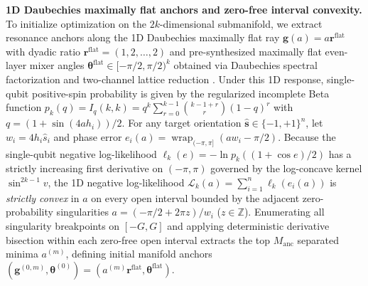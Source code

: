 \documentclass[10pt,a4paper]{article}
\begin{document}
\textbf{1D Daubechies maximally flat anchors and zero-free interval convexity.} To initialize optimization on the $2k$-dimensional submanifold, we extract resonance anchors along the 1D Daubechies maximally flat ray $\boldsymbol{g}(a) = a \boldsymbol{r}^{\mathrm{flat}}$ with dyadic ratio $\boldsymbol{r}^{\mathrm{flat}} = (1, 2, \ldots, 2)$ and pre-synthesized maximally flat even-layer mixer angles $\boldsymbol{\theta}^{\mathrm{flat}} \in [-\pi/2, \pi/2)^k$ obtained via Daubechies spectral factorization and two-channel lattice reduction \citep{daubechies1988orthonormal,herrmann1971approximation,yao2026echo}. Under this 1D response, single-qubit positive-spin probability is given by the regularized incomplete Beta function $p_k(q) = I_q(k, k) = q^k \sum_{r=0}^{k-1} \binom{k-1+r}{r}(1-q)^r$ with $q = (1 + \sin(4a h_i))/2$. For any target orientation $\hat{\boldsymbol{s}} \in \{-1, +1\}^n$, let $w_i = 4h_i \hat{s}_i$ and phase error $e_i(a) = \operatorname{wrap}_{(-\pi, \pi]}(a w_i - \pi/2)$. Because the single-qubit negative log-likelihood $\ell_k(e) = -\ln p_k((1 + \cos e)/2)$ has a strictly increasing first derivative on $(-\pi, \pi)$ governed by the log-concave kernel $\sin^{2k-1}v$, the 1D negative log-likelihood $\mathcal{L}_k(a) = \sum_{i=1}^n \ell_k(e_i(a))$ is \emph{strictly convex} in $a$ on every open interval bounded by the adjacent zero-probability singularities $a = (-\pi/2 + 2\pi z)/w_i$ ($z \in \mathbb{Z}$). Enumerating all singularity breakpoints on $[-G, G]$ and applying deterministic derivative bisection within each zero-free open interval extracts the top $M_{\mathrm{anc}}$ separated minima $a^{(m)}$, defining initial manifold anchors $(\boldsymbol{g}^{(0,m)}, \boldsymbol{\theta}^{(0)}) = (a^{(m)}\boldsymbol{r}^{\mathrm{flat}}, \boldsymbol{\theta}^{\mathrm{flat}})$.
\end{document}
